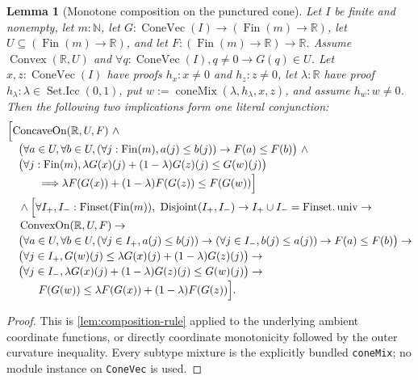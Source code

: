 \documentclass[9pt]{extarticle}
\newtheorem{lemma}{Lemma}[section]
\theoremstyle{definition}
\theoremstyle{remark}
\newcommand{\R}{\mathbb R}
\newcommand{\N}{\mathbb N}
\begin{document}
\begin{lemma}[Monotone composition on the punctured cone]
\label{lem:cone-composition-rule}
Let $I$ be finite and nonempty, let $m:\N$, let
$G:\operatorname{ConeVec}(I)\to(\operatorname{Fin}(m)\to\R)$, let
$U\subseteq(\operatorname{Fin}(m)\to\R)$, and let
$F:(\operatorname{Fin}(m)\to\R)\to\R$.  Assume
$\operatorname{Convex}(\R,U)$ and
$\forall q:\operatorname{ConeVec}(I),q\neq0\to G(q)\in U$.
Let $x,z:\operatorname{ConeVec}(I)$ have proofs $h_x:x\neq0$ and
$h_z:z\neq0$, let $\lambda:\R$ have proof
$h_\lambda:\lambda\in\operatorname{Set.Icc}(0,1)$, put
$w:=\operatorname{coneMix}(\lambda,h_\lambda,x,z)$, and assume $h_w:w\neq0$.
Then the following two implications form one literal conjunction:
\begin{align*}
 &\Bigl[
  \operatorname{ConcaveOn}(\R,U,F)\ \wedge\\[-2pt]
 &\quad
  \bigl(\forall a\in U,\forall b\in U,
    (\forall j:\operatorname{Fin}(m),a(j)\leq b(j))
    \to F(a)\leq F(b)\bigr)\ \wedge\\[-2pt]
 &\quad
  \bigl(\forall j:\operatorname{Fin}(m),
    \lambda G(x)(j)+(1-\lambda)G(z)(j)\leq G(w)(j)\bigr)\\[-2pt]
 &\hspace{10mm}\Longrightarrow
  \lambda F(G(x))+(1-\lambda)F(G(z))\leq F(G(w))
 \Bigr]\\
 &\quad\wedge\Bigl[
  \forall I_+,I_-:\operatorname{Finset}(\operatorname{Fin}(m)),\
  \operatorname{Disjoint}(I_+,I_-)\to
  I_+\cup I_-=\operatorname{Finset.univ}\to\\[-2pt]
 &\quad
  \operatorname{ConvexOn}(\R,U,F)\to\\[-2pt]
 &\quad
  \bigl(\forall a\in U,\forall b\in U,
   (\forall j\in I_+,a(j)\leq b(j))\to
   (\forall j\in I_-,b(j)\leq a(j))\to F(a)\leq F(b)\bigr)\to\\[-2pt]
 &\quad
  \bigl(\forall j\in I_+,
    G(w)(j)\leq\lambda G(x)(j)+(1-\lambda)G(z)(j)\bigr)\to\\[-2pt]
 &\quad
  \bigl(\forall j\in I_-,
    \lambda G(x)(j)+(1-\lambda)G(z)(j)\leq G(w)(j)\bigr)\to\\[-2pt]
 &\hspace{10mm}
  F(G(w))\leq\lambda F(G(x))+(1-\lambda)F(G(z))
 \Bigr].
\end{align*}
\end{lemma}

\begin{proof}
This is \cref{lem:composition-rule} applied to the underlying ambient
coordinate functions, or directly coordinate monotonicity followed by the
outer curvature inequality.  Every subtype mixture is the explicitly
bundled \texttt{coneMix}; no module instance on \texttt{ConeVec} is used.
\end{proof}
\end{document}

